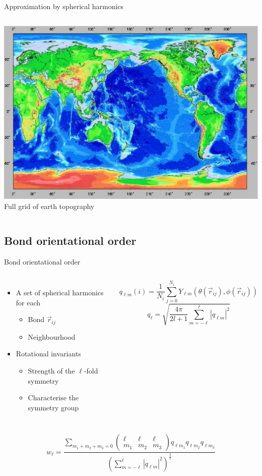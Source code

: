 \begin{frame}{Approximation by spherical harmonics}
\begin{columns}[T]
	\includegraphics[width=\textwidth]{earth_grid}\\
	Full grid of earth topography
	\end{columns}
\end{frame}

\subsection{Bond orientational order}


\begin{frame}{Bond orientational order}
	\begin{columns}
	\begin{itemize}
		\item A set of spherical harmonics for each
		\begin{itemize}
			\item Bond $\vec{r}_{ij}$
			\item Neighbourhood
		\end{itemize}
		\item Rotational invariants
		\begin{itemize}
			\item Strength of the $\ell$-fold symmetry
			\item Characterise the symmetry group
		\end{itemize}
	\end{itemize}
	\[ q_{\ell m}(i) = \frac{1}{N_i}\sum_{j=0}^{N_i} Y_{\ell m}(\theta(\vec r_{ij}),\phi(\vec r_{ij})) \]
	\[ q_\ell = \sqrt{\frac{4\pi}{2l+1} \sum_{m=-\ell}^{\ell} |q_{\ell m}|^2 } \]
	\end{columns}
	\[w_\ell = \frac{
		\sum\limits_{m_1+m_2+m_3=0} 
			\left( \begin{array}{ccc}
				\ell & \ell & \ell \\
				m_1 & m_2 & m_3 
			\end{array} \right)
			q_{\ell m_1} q_{\ell m_2} q_{\ell m_3}
	}{
		\left(
			\sum\limits_{m=-\ell}^{\ell} |q_{\ell m}|^2
		\right)^{\frac{3}{2}}
	}\]
	
	\footnotesize{}
\end{frame}

